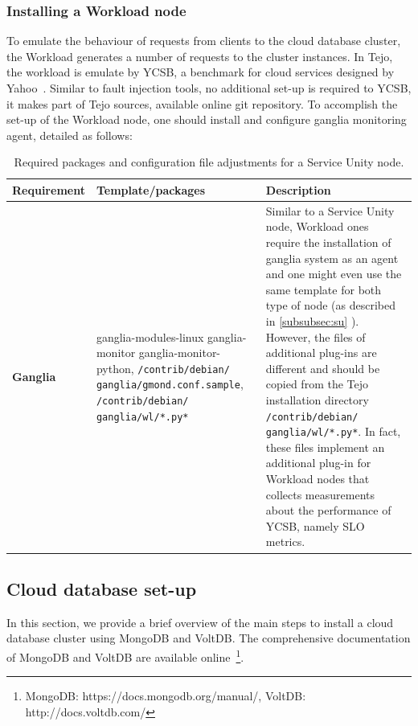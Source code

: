 \subsubsection{Installing a Workload node}

To emulate the behaviour of requests from clients to the cloud database cluster, the Workload generates a number of requests to the cluster instances. In Tejo, the workload is emulate by YCSB, a benchmark for cloud services designed by Yahoo~\cite{cooper2010benchmarking}. Similar to fault injection tools, no additional set-up is required to YCSB, it makes part of Tejo sources, available online git repository. To accomplish the set-up of the Workload node, one should install and configure ganglia monitoring agent, detailed as follows: 

			\begin{table}[htdp]
				\begin{center}
\caption{Required packages and configuration file adjustments for a Service Unity node.}
  \label{tab:common_install_conf}
					\begin{tabular}{R{2.5cm} || L{4.5cm} L{6cm} }
						{\bf Requirement}&{\bf Template/packages}&{\bf Description} \\  
						\hline
						\hline
						{\bf Ganglia}&ganglia-modules-linux ganglia-monitor ganglia-monitor-python, \verb|/contrib/debian/| \verb|ganglia/gmond.conf.sample|, \verb|/contrib/debian/| \verb|ganglia/wl/*.py*| & Similar to a Service Unity node, Workload ones require the installation of ganglia system as an agent and one might even use the same template for both type of node (as described in \ref{subsubsec:su} ). However, the files of additional plug-ins are different and should be copied from the Tejo installation directory \verb|/contrib/debian/| \verb|ganglia/wl/*.py*|. In fact, these files implement an additional plug-in for Workload nodes that collects measurements about the performance of YCSB, namely SLO metrics.\\
					\end{tabular}
				\end{center}
			\end{table}



\subsection{Cloud database set-up}
\label{subsec:dbsetup}

In this section, we provide a brief overview of the main steps to install a cloud database cluster using MongoDB and VoltDB. The comprehensive documentation of MongoDB and VoltDB are available online~\footnote{MongoDB: https://docs.mongodb.org/manual/, VoltDB: http://docs.voltdb.com/}.

